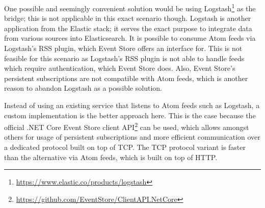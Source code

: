 One possible and seemingly convenient solution would be using Logstash\footnote{\url{https://www.elastic.co/products/logstash}} as the bridge; this is not applicable in this exact scenario though.
Logstash is another application from the Elastic stack; it serves the exact purpose to integrate data from various sources into Elasticsearch.
It is possible to consume Atom feeds via Logstash's \ac{RSS} plugin, which Event Store offers an interface for.
This is not feasible for this scenario as Logstash's \ac{RSS} plugin is not able to handle feeds which require authentication, which Event Store does.
Also, Event Store's persistent subscriptions are not compatible with Atom feeds, which is another reason to abandon Logstash as a possible solution.

Instead of using an existing service that listens to Atom feeds such as Logstash, a custom implementation is the better approach here.
This is the case because the official .NET Core Event Store client \ac{API}\footnote{\url{https://github.com/EventStore/ClientAPI.NetCore}} can be used, which allows amongst others for usage of persistent subscriptions and more efficient communication over a dedicated protocol built on top of \ac{TCP}.
The \ac{TCP} protocol variant is faster than the alternative via Atom feeds, which is built on top of \ac{HTTP}\cite{WEB:EvtSt-Which-Api}.


